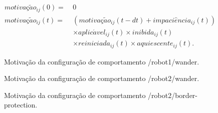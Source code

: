         \begin{equation} \label{eq:alliance_motivacao}
            \begin{aligned}
                motiva\textit{ç}\tilde{a}o_{ij}(0) = \ & 0 \\
                motiva\textit{ç}\tilde{a}o_{ij}(t) = \ & (motiva\textit{ç}\tilde{a}o_{ij}(t - dt) + impaci\hat{e}ncia_{ij}(t)) \\
                & \times aplic\acute{a}vel_{ij}(t) \times inibida_{ij}(t) \\
                & \times reiniciada_{ij}(t) \times aquiescente_{ij}(t).
            \end{aligned}
        \end{equation}
        
        \datatable
        \begin{figure}[htb]
            \centering
            
            \caption{Motivação da configuração de comportamento /robot1/wander.} \label{fig:motivacao1}
        \end{figure}
        
        \datatable
        \begin{figure}[htb]
            \centering
            
            \caption{Motivação da configuração de comportamento /robot2/wander.} \label{fig:motivacao2}
        \end{figure}
        
        \datatable
        \begin{figure}[htb]
            \centering
            
            \caption{Motivação da configuração de comportamento /robot2/border-protection.} \label{fig:motivacao3}
        \end{figure}